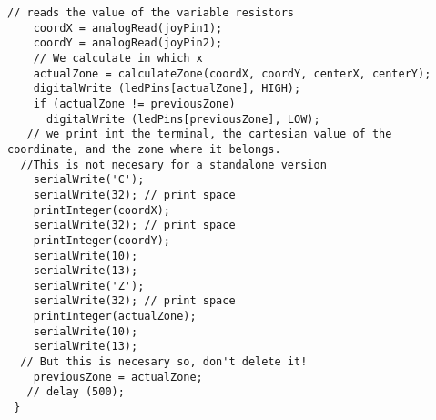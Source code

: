 \begin{lstlisting}[caption=This is the second original Arduino example \cite{arduino_joystick_example}, label=lst:second_syntax_example]
    // reads the value of the variable resistors 
    coordX = analogRead(joyPin1);   
    coordY = analogRead(joyPin2);   
    // We calculate in which x
    actualZone = calculateZone(coordX, coordY, centerX, centerY); 
    digitalWrite (ledPins[actualZone], HIGH);     
    if (actualZone != previousZone)
      digitalWrite (ledPins[previousZone], LOW);
   // we print int the terminal, the cartesian value of the coordinate, and the zone where it belongs. 
  //This is not necesary for a standalone version
    serialWrite('C');
    serialWrite(32); // print space
    printInteger(coordX);
    serialWrite(32); // print space
    printInteger(coordY);
    serialWrite(10);
    serialWrite(13);
    serialWrite('Z');
    serialWrite(32); // print space
    printInteger(actualZone);
    serialWrite(10);
    serialWrite(13);
  // But this is necesary so, don't delete it!
    previousZone = actualZone;
   // delay (500);
 }
\end{lstlisting}
